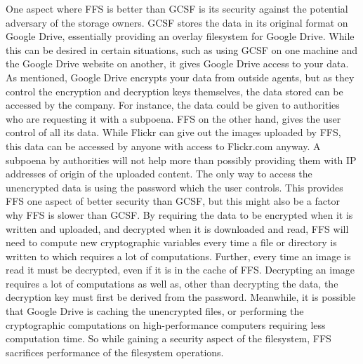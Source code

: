 One aspect where FFS is better than GCSF is its security against the potential adversary of the storage owners. GCSF stores the data in its original format on Google Drive, essentially providing an overlay filesystem for Google Drive. While this can be desired in certain situations, such as using GCSF on one machine and the Google Drive website on another, it gives Google Drive access to your data. As mentioned, Google Drive encrypts your data from outside agents, but as they control the encryption and decryption keys themselves, the data stored can be accessed by the company. For instance, the data could be given to authorities who are requesting it with a subpoena. FFS on the other hand, gives the user control of all its data. While Flickr can give out the images uploaded by FFS, this data can be accessed by anyone with access to Flickr.com anyway. A subpoena by authorities will not help more than possibly providing them with IP addresses of origin of the uploaded content. The only way to access the unencrypted data is using the password which the user controls. This provides FFS one aspect of better security than GCSF, but this might also be a factor why FFS is slower than GCSF. By requiring the data to be encrypted when it is written and uploaded, and decrypted when it is downloaded and read, FFS will need to compute new cryptographic variables every time a file or directory is written to which requires a lot of computations. Further, every time an image is read it must be decrypted, even if it is in the cache of FFS. Decrypting an image requires a lot of computations as well as, other than decrypting the data, the decryption key must first be derived from the password. Meanwhile, it is possible that Google Drive is caching the unencrypted files, or performing the cryptographic computations on high-performance computers requiring less computation time. So while gaining a security aspect of the filesystem, FFS sacrifices performance of the filesystem operations.